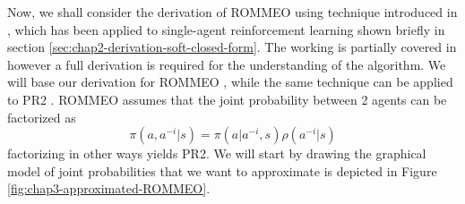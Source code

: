Now, we shall consider the derivation of ROMMEO using technique introduced in \cite{levine2018reinforcement}, which has been applied to single-agent reinforcement learning shown briefly in section \ref{sec:chap2-derivation-soft-closed-form}. The working is partially covered in \cite{yu2019multi, wen2019multi} however a full derivation is required for the understanding of the algorithm. We will base our derivation for ROMMEO \cite{tian2019regularized}, while the same technique can be applied to PR2 \cite{wen2019probabilistic}. ROMMEO assumes that the joint probability between 2 agents can be factorized as
\begin{equation}
    \pi(a, a^{-i} | s) = \pi(a | a^{-i}, s) \rho(a^{-i} | s)
\end{equation}
factorizing in other ways yields PR2. We will start by drawing the graphical model of joint probabilities that we want to approximate is depicted in Figure \ref{fig:chap3-approximated-ROMMEO}. 
